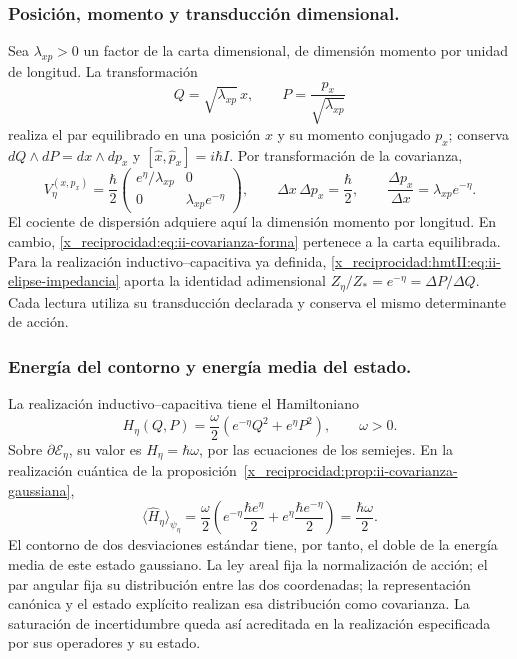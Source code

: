 \subsubsection{Posición, momento y transducción dimensional.}
Sea \(\lambda_{xp}>0\) un factor de la carta dimensional, de dimensión
momento por unidad de longitud. La transformación
\[
 Q=\sqrt{\lambda_{xp}}\,x,\qquad
 P=\frac{p_x}{\sqrt{\lambda_{xp}}}
\]
realiza el par equilibrado en una posición \(x\) y su momento conjugado
\(p_x\); conserva \(dQ\wedge dP=dx\wedge dp_x\) y
\([\widehat x,\widehat p_x]=i\hbar I\). Por transformación de la
covarianza,
\begin{equation}
 V_\eta^{(x,p_x)}=\frac{\hbar}{2}
 \begin{pmatrix}e^\eta/\lambda_{xp}&0\\
                 0&\lambda_{xp}e^{-\eta}\end{pmatrix},\qquad
 \Delta x\,\Delta p_x=\frac{\hbar}{2},\qquad
 \frac{\Delta p_x}{\Delta x}=\lambda_{xp}e^{-\eta}.
 \label{x_reciprocidad:eq:ii-covarianza-dimensiones}
\end{equation}
El cociente de dispersión adquiere aquí la dimensión momento por longitud.
En cambio, \eqref{x_reciprocidad:eq:ii-covarianza-forma} pertenece a la carta equilibrada.
Para la realización inductivo--capacitiva ya definida,
\eqref{x_reciprocidad:hmtII:eq:ii-elipse-impedancia} aporta la identidad adimensional
\(Z_\eta/Z_*=e^{-\eta}=\Delta P/\Delta Q\).
Cada lectura utiliza su transducción declarada y conserva el mismo
determinante de acción.

\subsubsection{Energía del contorno y energía media del estado.}
La realización inductivo--capacitiva tiene el Hamiltoniano
\[
 H_\eta(Q,P)=\frac{\omega}{2}
 \left(e^{-\eta}Q^2+e^\eta P^2\right),\qquad \omega>0.
\]
Sobre \(\partial\mathcal E_\eta\), su valor es
\(H_\eta=\hbar\omega\), por las ecuaciones de los semiejes. En la
realización cuántica de la proposición~\ref{x_reciprocidad:prop:ii-covarianza-gaussiana},
\begin{equation}
 \langle\widehat H_\eta\rangle_{\psi_\eta}
 =\frac{\omega}{2}
 \left(e^{-\eta}\frac{\hbar e^\eta}{2}
       +e^\eta\frac{\hbar e^{-\eta}}{2}\right)
 =\frac{\hbar\omega}{2}.
 \label{x_reciprocidad:eq:ii-energia-contorno-covarianza}
\end{equation}
El contorno de dos desviaciones estándar tiene, por tanto, el doble de la
energía media de este estado gaussiano. La ley areal fija la normalización
de acción; el par angular fija su distribución entre las dos coordenadas;
la representación canónica y el estado explícito realizan esa distribución
como covarianza. La saturación de incertidumbre queda así acreditada en
la realización especificada por sus operadores y su estado.

